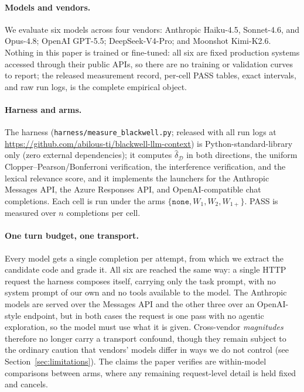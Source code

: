 \documentclass[11pt]{article}
\theoremstyle{plain}
\theoremstyle{definition}
\theoremstyle{remark}
\newcommand{\dhat}{\widehat{\delta}}
\newcommand{\Dcal}{\mathcal{D}}
\begin{document}
\paragraph{Models and vendors.}
We evaluate six models across four vendors: Anthropic Haiku-4.5, Sonnet-4.6, and Opus-4.8; OpenAI
GPT-5.5; DeepSeek-V4-Pro; and Moonshot Kimi-K2.6. Nothing in this paper is trained or fine-tuned:
all six are fixed production systems accessed through their public APIs, so there are no training
or validation curves to report; the released measurement record, per-cell PASS tables, exact
intervals, and raw run logs, is the complete empirical object.

\paragraph{Harness and arms.}
The harness (\texttt{harness/measure\_blackwell.py}; released with all run logs at
\url{https://github.com/abilous-ti/blackwell-llm-context}) is Python-standard-library only (zero
external dependencies); it computes $\dhat_{\Dcal}$ in both directions, the uniform
Clopper--Pearson/Bonferroni verification, the interference verification, and the lexical relevance
score, and it implements the launchers for the Anthropic Messages API, the Azure Responses API,
and OpenAI-compatible chat completions. Each cell is run under the arms $\{\texttt{none}, W_1, W_2,
W_{1+}\}$. PASS is measured over $n$ completions per cell.

\paragraph{One turn budget, one transport.}
Every model gets a single completion per attempt, from which we extract the candidate code and
grade it. All six are reached the same way: a single HTTP request the harness composes itself,
carrying only the task prompt, with no system prompt of our own and no tools available to the
model. The Anthropic models are served over the Messages API and the other three over an
OpenAI-style endpoint, but in both cases the request is one pass with no agentic exploration, so
the model must use what it is given. Cross-vendor \emph{magnitudes} therefore no
longer carry a transport confound, though they remain subject to the ordinary caution that
vendors' models differ in ways we do not control (see Section~\ref{sec:limitations}). The claims the paper
verifies are within-model comparisons between arms, where any remaining request-level detail is
held fixed and cancels.
\end{document}
